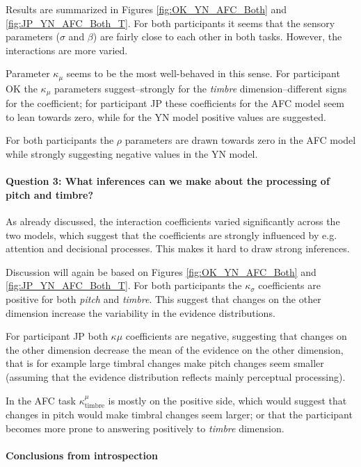\documentclass{article}\usepackage{knitr}
\begin{document}
Results are summarized in Figures \ref{fig:OK_YN_AFC_Both} and \ref{fig:JP_YN_AFC_Both_T}. For both participants it seems that the sensory parameters ($\sigma$ and $\beta$) are fairly close to each other in both tasks. However, the interactions are more varied. 

Parameter $\kappa_{\mu}$ seems to be the most well-behaved  in this sense. For participant OK the $\kappa_{\mu}$ parameters suggest--strongly for the \textit{timbre} dimension--different signs for the coefficient; for participant JP these coefficients for the AFC model seem to lean towards zero, while for the YN model positive values are suggested. 

For both participants the $\rho$ parameters are drawn towards zero in the AFC model while strongly suggesting negative values in the YN model. 

\paragraph{Question 3: What inferences can we make about the processing of pitch and timbre?}

As already discussed, the interaction coefficients varied significantly across the two models, which suggest that the coefficients are strongly influenced by e.g. attention and decisional processes. This makes it hard to draw strong inferences.

Discussion will again be based on Figures \ref{fig:OK_YN_AFC_Both} and \ref{fig:JP_YN_AFC_Both_T}. For both participants the $\kappa_{\sigma}$ coefficients are positive for both \textit{pitch} and \textit{timbre}. This suggest that  changes on the other dimension increase the variability in the evidence distributions. 

For participant JP both $\kappa{\mu}$ coefficients are negative, suggesting that changes on the other dimension decrease the mean of the evidence on the other dimension, that is for example large timbral changes make pitch changes seem smaller (assuming that the evidence distribution reflects mainly perceptual processing).

In the AFC task $\kappa^{\mu}_\text{timbre}$ is mostly on the positive side, which would suggest that changes in pitch would make timbral changes seem larger; or that the participant becomes more prone to answering positively to \textit{timbre} dimension. 

\paragraph{Conclusions from introspection}
\end{document}
